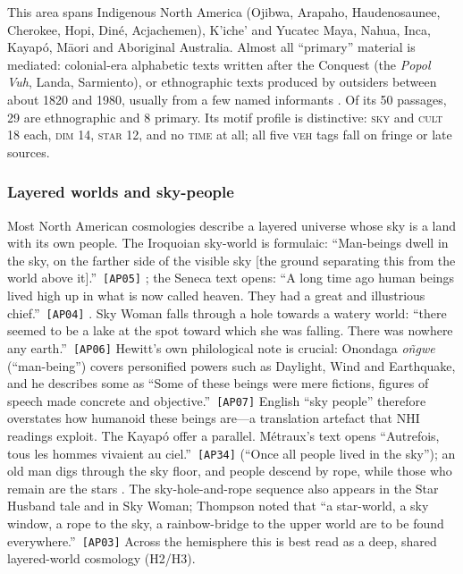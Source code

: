 \documentclass[11pt,a4paper]{article}
\newcommand{\pid}[1]{\texttt{\small #1}}
\begin{document}
This area spans Indigenous North America (Ojibwa, Arapaho, Haudenosaunee, Cherokee, Hopi, Diné, Acjachemen), K'iche' and Yucatec Maya, Nahua, Inca, Kayapó, Māori and Aboriginal Australia. Almost all ``primary'' material is mediated: colonial-era alphabetic texts written after the Conquest (the \emph{Popol Vuh}, Landa, Sarmiento), or ethnographic texts produced by outsiders between about 1820 and 1980, usually from a few named informants \parencite{hewitt1903iroquoian,mooney1900myths,voth1905traditions,boscana1846chinigchinich,smith1913lore,parker1905euahlayi,metraux1960mythes}. Of its 50 passages, 29 are ethnographic and 8 primary. Its motif profile is distinctive: \textsc{sky} and \textsc{cult} 18 each, \textsc{dim} 14, \textsc{star} 12, and no \textsc{time} at all; all five \textsc{veh} tags fall on fringe or late sources.

\subsubsection{Layered worlds and sky-people}

Most North American cosmologies describe a layered universe whose sky is a land with its own people. The Iroquoian sky-world is formulaic: \enquote{Man-beings dwell in the sky, on the farther side of the visible sky [the ground separating this from the world above it].}~\pid{[AP05]} \parencite{hewitt1903iroquoian}; the Seneca text opens: \enquote{A long time ago human beings lived high up in what is now called heaven. They had a great and illustrious chief.}~\pid{[AP04]} \parencite{thompson1929tales}. Sky Woman falls through a hole towards a watery world: \enquote{there seemed to be a lake at the spot toward which she was falling. There was nowhere any earth.}~\pid{[AP06]} Hewitt's own philological note is crucial: Onondaga \emph{oñgwe} (``man-being'') covers personified powers such as Daylight, Wind and Earthquake, and he describes some as \enquote{Some of these beings were mere fictions, figures of speech made concrete and objective.}~\pid{[AP07]} English ``sky people'' therefore overstates how humanoid these beings are---a translation artefact that NHI readings exploit. The Kayapó offer a parallel. Métraux's text opens \enquote{Autrefois, tous les hommes vivaient au ciel.}~\pid{[AP34]} (``Once all people lived in the sky''); an old man digs through the sky floor, and people descend by rope, while those who remain are the stars \parencite{metraux1960mythes}. The sky-hole-and-rope sequence also appears in the Star Husband tale and in Sky Woman; Thompson noted that \enquote{a star-world, a sky window, a rope to the sky, a rainbow-bridge to the upper world are to be found everywhere.}~\pid{[AP03]} Across the hemisphere this is best read as a deep, shared layered-world cosmology (H2/H3).
\end{document}
